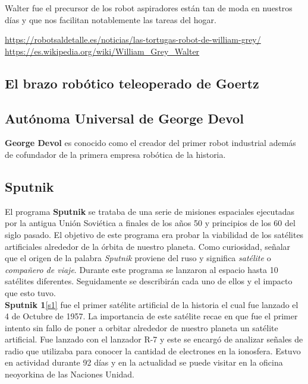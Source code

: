 \documentclass[paper=a4, fontsize=11pt]{scrartcl}
\begin{document}
Walter fue el precursor de los robot aspiradores están tan de moda en nuestros días y que nos facilitan notablemente las tareas del hogar.

\url{https://robotsaldetalle.es/noticias/las-tortugas-robot-de-william-grey/}
\url{https://es.wikipedia.org/wiki/William_Grey_Walter}
\url{}
\url{}

\subsection{El brazo robótico teleoperado de Goertz}

\subsection{Autónoma Universal de George Devol}

\textbf{George Devol} es conocido como el creador del primer robot industrial además de cofundador de la primera empresa robótica de la historia.

\subsection{Sputnik}

El programa \textbf{Sputnik} se trataba de una serie de misiones espaciales ejecutadas por la antigua Unión Soviética a finales de los años 50 y principios de los 60 del siglo pasado. El objetivo de este programa era probar la viabilidad de los satélites artificiales alrededor de la órbita de nuestro planeta.
Como curiosidad, señalar que el origen de la palabra \textit{Sputnik} proviene del ruso y significa \textit{satélite} o \textit{compañero de viaje}.
Durante este programa se lanzaron al espacio hasta 10 satélites diferentes. Seguidamente se describirán cada uno de ellos y el impacto que esto tuvo.\\


\textbf{Sputnik 1}\ref{s1} fue el primer satélite artificial de la historia el cual fue lanzado el 4 de Octubre de 1957. La importancia de este satélite recae en que fue el primer intento sin fallo de poner a orbitar alrededor de nuestro planeta un satélite artificial. Fue lanzado con el lanzador R-7 y este se encargó de analizar señales de radio que utilizaba para conocer la cantidad de electrones en la ionosfera. Estuvo en actividad durante 92 días y en la actualidad se puede visitar en la oficina neoyorkina de las Naciones Unidad.\\ 
\end{document}

